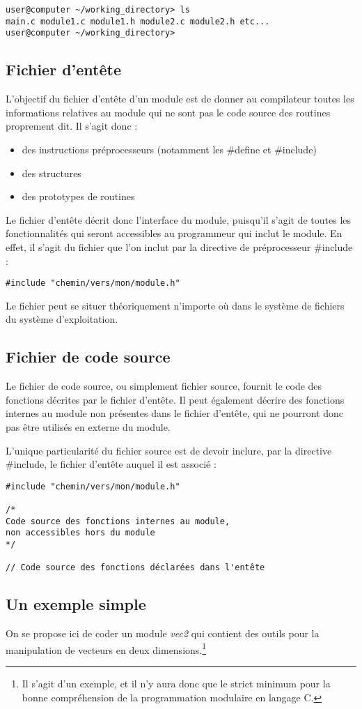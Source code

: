 \documentclass[../../../main.tex]{subfiles}
\begin{document}
\begin{verbatim}
user@computer ~/working_directory> ls
main.c module1.c module1.h module2.c module2.h etc...
user@computer ~/working_directory>
\end{verbatim}
\subsection{Fichier d'entête}
L'objectif du fichier d'entête d'un module est de donner au compilateur toutes les informations relatives au module qui ne sont pas le code source des routines proprement dit. Il s'agit donc :
\begin{itemize}
	\item des instructions préprocesseurs (notamment les \textsf{\#define} et \textsf{\#include})
	\item des structures
	\item des prototypes de routines
\end{itemize}
Le fichier d'entête décrit donc l'interface du module, puisqu'il s'agit de toutes les fonctionnalités qui seront accessibles au programmeur qui inclut le module. En effet, il s'agit du fichier que l'on inclut par la directive de préprocesseur \textsf{\#include} :
\begin{verbatim}
#include "chemin/vers/mon/module.h"
\end{verbatim}
Le fichier peut se situer théoriquement n'importe où dans le système de fichiers du système d'exploitation.
\subsection{Fichier de code source}
Le fichier de code source, ou simplement fichier source, fournit le code des fonctions décrites par le fichier d'entête. Il peut également décrire des fonctions internes au module non présentes dans le fichier d'entête, qui ne pourront donc pas être utilisés en externe du module.
 
L'unique particularité du fichier source est de devoir inclure, par la directive \textsf{\#include}, le fichier d'entête auquel il est associé :
\begin{verbatim}
#include "chemin/vers/mon/module.h"

/*
Code source des fonctions internes au module,
non accessibles hors du module
*/

// Code source des fonctions déclarées dans l'entête
\end{verbatim}
\subsection{Un exemple simple}
On se propose ici de coder un module \textit{vec2} qui contient des outils pour la manipulation de vecteurs en deux dimensions.\footnote{Il s'agit d'un exemple, et il n'y aura donc que le strict minimum pour la bonne compréhension de la programmation modulaire en langage C.}
 
\end{document}

